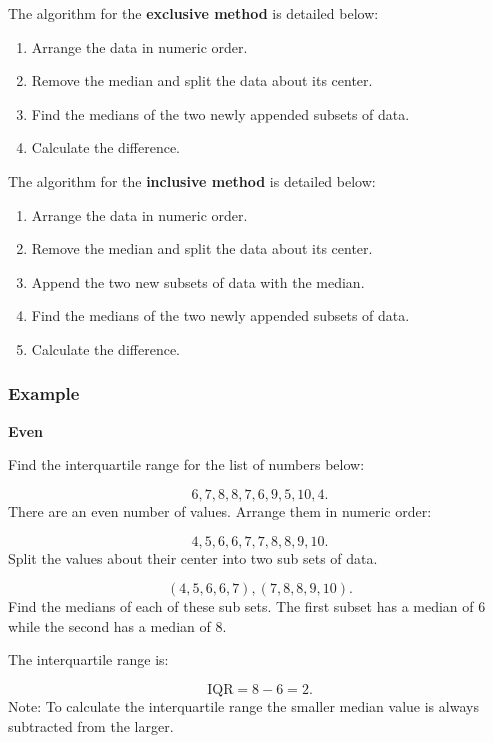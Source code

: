 \documentclass[
]{book}
\providecommand{\tightlist}{%
  \setlength{\itemsep}{0pt}\setlength{\parskip}{0pt}}
\begin{document}
The algorithm for the \textbf{exclusive method} is detailed below:

\begin{enumerate}
\def\labelenumi{\arabic{enumi}.}
\tightlist
\item
  Arrange the data in numeric order.
\item
  Remove the median and split the data about its center.
\item
  Find the medians of the two newly appended subsets of data.
\item
  Calculate the difference.
\end{enumerate}

The algorithm for the \textbf{inclusive method} is detailed below:

\begin{enumerate}
\def\labelenumi{\arabic{enumi}.}
\tightlist
\item
  Arrange the data in numeric order.
\item
  Remove the median and split the data about its center.
\item
  Append the two new subsets of data with the median.
\item
  Find the medians of the two newly appended subsets of data.
\item
  Calculate the difference.
\end{enumerate}

\hypertarget{example-8}{%
\subsubsection{Example}\label{example-8}}

\textbf{Even}

Find the interquartile range for the list of numbers below:

\[6, 7, 8, 8, 7, 6, 9, 5, 10, 4. \]
There are an even number of values. Arrange them in numeric order:

\[ 4, 5, 6, 6, 7, 7, 8, 8, 9, 10.\]
Split the values about their center into two sub sets of data.

\[ (4, 5, 6, 6, 7), (7, 8, 8, 9, 10). \]
Find the medians of each of these sub sets. The first subset has a median of 6 while the second has a median of 8.

The interquartile range is:

\[ \textrm{IQR} = 8 - 6 = 2.\]
Note: To calculate the interquartile range the smaller median value is always subtracted from the larger.
\end{document}
